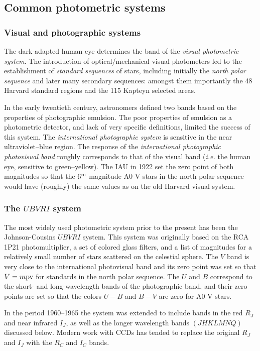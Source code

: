 \subsection{Common photometric systems}

\subsubsection{Visual and photographic systems}
The dark-adapted human eye
determines the band of the {\it visual photometric system}. The
introduction of optical/mechanical visual photometers led to the
establishment of {\it standard sequences} of stars, including
initially the {\it north polar sequence} and later many secondary
sequences: amongst them importantly the 48 Harvard standard regions and the 115 Kapteyn
selected areas.

In the
early twentieth century, astronomers defined two bands based on the
properties of photographic emulsion. The
poor properties of emulsion as a photometric detector, and lack of 
very specific definitions, limited the success of this system. The
{\it international photographic system} is sensitive in the near
ultraviolet--blue region. The response of the {\it international
  photographic photovisual band} roughly corresponds to that of the
visual band ({\it i.e.} the human eye, sensitive to green--yellow). The
IAU in 1922 set the zero point of both magnitudes so that the $6^{\rm
  m}$ magnitude A0 V stars in the north polar sequence would have
(roughly) the same values as on the old Harvard visual system.

\subsubsection{The $UBVRI$ system}
The most widely used photometric system
prior to the present has been the Johnson-Cousins $UBVRI$ system. This
system was originally based on the RCA 1P21 photomultiplier, a set of
colored glass filters, and a list of magnitudes for a relatively small
number of stars scattered on the celestial sphere. The $V$ band is very
close to the international photovisual band and its zero point was set
so that $V=m{\rm pv}$ for standards in the north polar sequence. The $U$
and $B$ correspond to the short- and long-wavelength bands of the
photographic band, and their zero points are set so that the colors
$U-B$ and $B-V$ are zero for A0 V stars. 

In the period 1960--1965 the system was extended to include bands in
the red $R_J$ and near infrared $I_J$, as well as the longer
wavelength bands $(JHKLMNQ)$ discussed below. Modern work with CCDs
has tended to replace the original $R_J$ and $I_J$ with the $R_C$ and
$I_C$ bands. 

